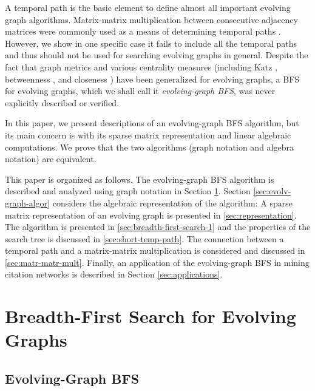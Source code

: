 \documentclass[11pt, conference, , compsocconf]{IEEEtran}
\theoremstyle{definition}
\begin{document}
A temporal path is the basic element to 
 define almost  all important evolving graph algorithms.
Matrix-matrix multiplication between consecutive adjacency matrices
were commonly used as a means of determining temporal paths \cite{gphe11} \cite{grihig13}. However, we show
in one specific case it fails to include all the temporal paths and thus should not be used 
for searching evolving graphs in general.
Despite the fact that graph metrics \cite{ntmm13} \cite{tmml09} \cite{tsmm09} and 
various centrality measures (including Katz  \cite{gphe11} \cite{grihig13}, 
betweenness \cite{alhi15}, and closeness  \cite{tmml10}) 
have been generalized for evolving graphs,
a BFS for evolving graphs, which we shall call it \emph{evolving-graph BFS},
was never explicitly described or verified.


In this paper,  we present descriptions of an evolving-graph BFS algorithm, but its main concern is with its sparse matrix
representation and linear algebraic computations. 
We prove that the two algorithms (graph notation and algebra notation) are equivalent.  


This paper is organized as follows. The evolving-graph BFS algorithm is described
and analyzed using graph notation in Section \ref{sec:breadth-first-search}. Section \ref{sec:evolv-graph-algor} considers the algebraic representation of the algorithm: 
A sparse matrix representation
of an evolving graph is presented in \ref{sec:representation}. 
The algorithm is presented in \ref{sec:breadth-first-search-1} and 
the properties of the search tree is discussed in \ref{sec:short-temp-path}.
The connection between a temporal path and a matrix-matrix multiplication is considered and discussed in \ref{sec:matr-matr-mult}. Finally, 
an application of the evolving-graph BFS in mining citation networks is described in Section \ref{sec:applications}.

\section{Breadth-First Search for Evolving Graphs}
\label{sec:breadth-first-search}

\subsection{Evolving-Graph BFS}
\label{sec:evolving-graph-bfs}
\end{document}
